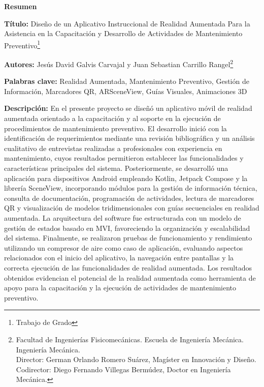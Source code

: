 \begin{center}
\textbf{Resumen}\par
\end{center}

\vspace{\baselineskip}
\noindent
\textbf{Título:} Diseño de un Aplicativo Instruccional de Realidad Aumentada Para la Asistencia en la Capacitación y Desarrollo de Actividades de Mantenimiento Preventivo\footnote[1]{Trabajo de Grado}

\noindent
\textbf{Autores:} Jesús David Galvis Carvajal y Juan Sebastian Carrillo Rangel\footnote[2]{Facultad de Ingenierías Fisicomecánicas. Escuela de Ingeniería Mecánica. Ingeniería Mecánica. \\ Director: German Orlando Romero Suárez, Magíster en Innovación y Diseño. \\ Codirector: Diego Fernando Villegas Bermúdez, Doctor en Ingeniería Mecánica.}

\noindent
\textbf{Palabras clave:} Realidad Aumentada, Mantenimiento Preventivo, Gestión de Información, Marcadores QR, ARSceneView, Guías Visuales, Animaciones 3D

\vspace{\baselineskip}

\noindent
\textbf{Descripción:} En el presente proyecto se diseñó un aplicativo móvil de realidad aumentada orientado a la capacitación y al soporte en la ejecución de procedimientos de mantenimiento preventivo. El desarrollo inició con la identificación de requerimientos mediante una revisión bibliográfica y un análisis cualitativo de entrevistas realizadas a profesionales con experiencia en mantenimiento, cuyos resultados permitieron establecer las funcionalidades y características principales del sistema. Posteriormente, se desarrolló una aplicación para dispositivos Android empleando Kotlin, Jetpack Compose y la librería SceneView, incorporando módulos para la gestión de información técnica, consulta de documentación, programación de actividades, lectura de marcadores QR y visualización de modelos tridimensionales con guías secuenciales en realidad aumentada. La arquitectura del software fue estructurada con un modelo de gestión de estados basado en MVI, favoreciendo la organización y escalabilidad del sistema. Finalmente, se realizaron pruebas de funcionamiento y rendimiento utilizando un compresor de aire como caso de aplicación, evaluando aspectos relacionados con el inicio del aplicativo, la navegación entre pantallas y la correcta ejecución de las funcionalidades de realidad aumentada. Los resultados obtenidos evidencian el potencial de la realidad aumentada como herramienta de apoyo para la capacitación y la ejecución de actividades de mantenimiento preventivo.

